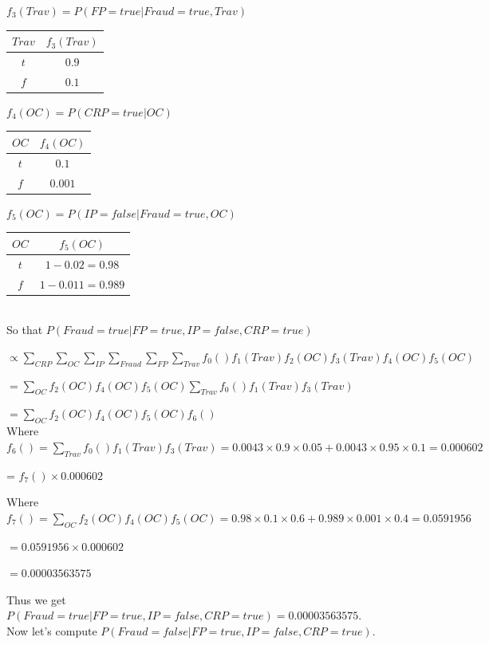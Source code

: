 \documentclass[10pt]{article}
\begin{document}
	$f_3(Trav) = P(FP = true | Fraud = true, Trav)$
	\begin{tabular}{|c|c|}
	\hline
 	  $Trav$ & $f_3(Trav)$ \\
	\hline
	  $t$ & $ 0.9$  \\
	\hline
	  $f$ & $0.1$ \\
	\hline
	\end{tabular}
	
	
	$f_4(OC) = P(CRP = true | OC)$
	\begin{tabular}{|c|c|}
	\hline
 	  $OC$ & $f_4(OC)$ \\
	\hline
	  $t$ & $ 0.1$  \\
	\hline
	  $f$ & $0.001$ \\
	\hline
	\end{tabular}
	
	$f_5(OC) = P(IP = false | Fraud = true, OC)$
	\begin{tabular}{|c|c|}
	\hline
 	  $OC$ & $f_5(OC)$ \\
	\hline
	  $t$ & $ 1 - 0.02 = 0.98$  \\
	\hline
	  $f$ & $ 1 - 0.011 = 0.989$ \\
	\hline
	\end{tabular}\\
	
	
	So that $P(Fraud = true | FP = true, IP = false, CRP = true)$
	
	$\propto \sum_{CRP} \sum_{OC} \sum_{IP} \sum_{Fraud} \sum_{FP} \sum_{Trav} f_0() f_1(Trav) f_2(OC) f_3(Trav) f_4(OC) f_5(OC)$
	
	$= \sum_{OC}f_2(OC) f_4(OC) f_5(OC) \sum_{Trav}f_0() f_1(Trav) f_3(Trav)$
	
	$= \sum_{OC}f_2(OC) f_4(OC) f_5(OC) f_6()$\\
	
	Where $f_6() = \sum_{Trav}f_0() f_1(Trav) f_3(Trav) = 0.0043 \times 0.9 \times 0.05 + 0.0043 \times 0.95 \times 0.1 = 0.000602$
	
	= $f_7() \times 0.000602$
	
	Where $f_7() = \sum_{OC}f_2(OC) f_4(OC) f_5(OC) = 0.98 \times 0.1 \times 0.6 + 0.989 \times 0.001 \times 0.4 = 0.0591956$
	
	$= 0.0591956 \times 0.000602$
	
	$= 0.00003563575$
	
	Thus we get $P(Fraud = true | FP = true, IP = false, CRP = true) = 0.00003563575$. \\
	
	Now let's compute $P(Fraud = false | FP = true, IP = false, CRP = true)$.
	
\end{document}
